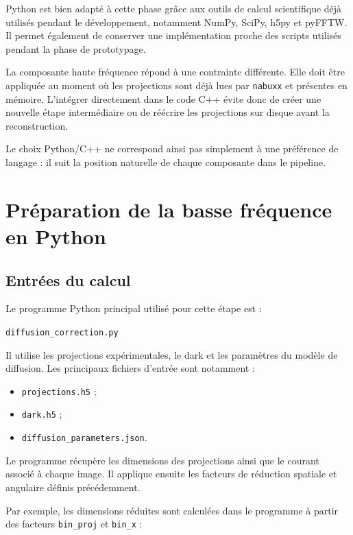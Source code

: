 \documentclass[11pt,a4paper]{report}
\begin{document}
Python est bien adapté à cette phase grâce aux outils de calcul scientifique
déjà utilisés pendant le développement, notamment NumPy, SciPy, h5py et
pyFFTW. Il permet également de conserver une implémentation proche des
scripts utilisés pendant la phase de prototypage.

La composante haute fréquence répond à une contrainte différente. Elle doit
être appliquée au moment où les projections sont déjà lues par
\texttt{nabuxx} et présentes en mémoire. L'intégrer directement dans le code
C++ évite donc de créer une nouvelle étape intermédiaire ou de réécrire les
projections sur disque avant la reconstruction.

Le choix Python/C++ ne correspond ainsi pas simplement à une préférence de
langage : il suit la position naturelle de chaque composante dans le
pipeline.

\section{Préparation de la basse fréquence en Python}

\subsection{Entrées du calcul}

Le programme Python principal utilisé pour cette étape est :

\begin{center}
\texttt{diffusion\_correction.py}
\end{center}

Il utilise les projections expérimentales, le dark et les paramètres du
modèle de diffusion. Les principaux fichiers d'entrée sont notamment :

\begin{itemize}
    \item \texttt{projections.h5} ;
    \item \texttt{dark.h5} ;
    \item \texttt{diffusion\_parameters.json}.
\end{itemize}

Le programme récupère les dimensions des projections ainsi que le courant
associé à chaque image. Il applique ensuite les facteurs de réduction
spatiale et angulaire définis précédemment.

Par exemple, les dimensions réduites sont calculées dans le programme à
partir des facteurs \texttt{bin\_proj} et \texttt{bin\_x} :
\end{document}
